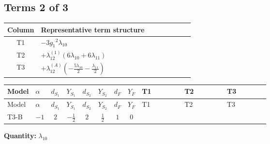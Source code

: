 \documentclass[8pt]{article}
\begin{document}
\begin{landscape}
\subsection*{Terms 2 of 3}
\begin{center}
\begin{tabular}{@{}c >{\raggedright\arraybackslash}p{0.82\linewidth}@{}}
\toprule
Column & Representative term structure \\
\midrule
T1 & \(\displaystyle -3 {g_1}^2 {\lambda_{10}}\) \\
\midrule
T2 & \(\displaystyle +{\lambda_{12}^{(1)}} (6 {\lambda_{10}}+6 {\lambda_{11}})\) \\
\midrule
T3 & \(\displaystyle +{\lambda_{12}^{(A)}} \left(-\frac{5 {\lambda_{10}}}{2}-\frac{{\lambda_{11}}}{2}\right)\) \\
\midrule
\bottomrule
\end{tabular}
\end{center}
\smallskip
\tiny
\begin{longtable}{@{}llcccccc >{\raggedright\arraybackslash}p{0.21\linewidth} >{\raggedright\arraybackslash}p{0.21\linewidth} >{\raggedright\arraybackslash}p{0.21\linewidth}@{}}
\toprule
Model & $\alpha$ & $d_{S_1}$ & $Y_{S_1}$ & $d_{S_2}$ & $Y_{S_2}$ & $d_F$ & $Y_F$ & T1 & T2 & T3 \\
\midrule
\endfirsthead
\toprule
Model & $\alpha$ & $d_{S_1}$ & $Y_{S_1}$ & $d_{S_2}$ & $Y_{S_2}$ & $d_F$ & $Y_F$ & T1 & T2 & T3 \\
\midrule
\endhead
T3-B & $-1$ & $2$ & $-\frac{1}{2}$ & $2$ & $\frac{1}{2}$ & $1$ & $0$ & \scriptsize\adjustbox{max width=\linewidth}{$\begin{gathered} -3 {g_1}^2 {\lambda_{10}}\end{gathered}$} & \scriptsize\adjustbox{max width=\linewidth}{$\begin{gathered} +{\lambda_{12}^{(1)}} (6 {\lambda_{10}}+6 {\lambda_{11}})\end{gathered}$} & \scriptsize\adjustbox{max width=\linewidth}{$\begin{gathered} +{\lambda_{12}^{(A)}} \left(-\frac{5 {\lambda_{10}}}{2}-\frac{{\lambda_{11}}}{2}\right)\end{gathered}$} \\
\midrule
\bottomrule
\end{longtable}
\clearpage
\noindent\textbf{Quantity: }$\lambda_{10}$\par\smallskip

\end{landscape}
\end{document}
